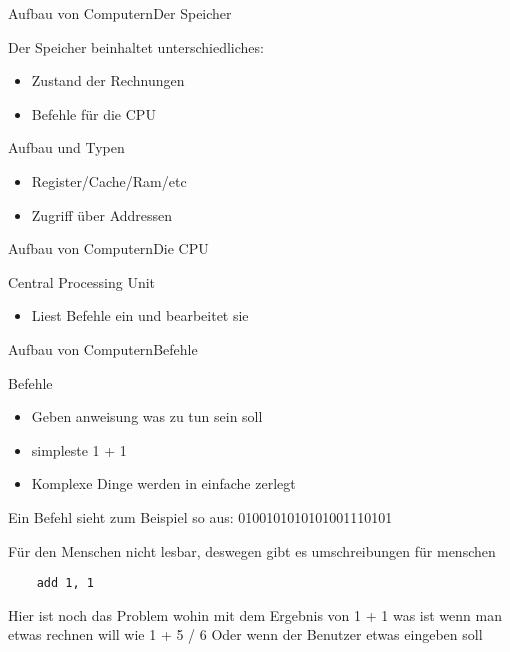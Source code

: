\begin{frame}{Aufbau von Computern}{Der Speicher}
		
	Der Speicher beinhaltet unterschiedliches:
	\begin{itemize}
	\item Zustand der Rechnungen
	\item Befehle für die CPU
	\end{itemize}
	
	Aufbau und Typen
	\begin{itemize}
	\item Register/Cache/Ram/etc
	\item Zugriff über Addressen
	\end{itemize}
	

\end{frame}




\begin{frame}{Aufbau von Computern}{Die CPU}
		
	Central Processing Unit
	\begin{itemize}
	\item Liest Befehle ein und bearbeitet sie
	\end{itemize}

\end{frame}


\begin{frame}[fragile]{Aufbau von Computern}{Befehle}
		
	Befehle
	\begin{itemize}
	\item Geben anweisung was zu tun sein soll
	\item simpleste 1 + 1 
	\item Komplexe Dinge werden in einfache zerlegt
	\end{itemize}
	
	Ein Befehl sieht zum Beispiel so aus:
	0100101010101001110101 
	
	Für den Menschen nicht lesbar, deswegen gibt es umschreibungen für menschen
	
	
	\begin{lstlisting}
	add 1, 1
	\end{lstlisting}
	
	Hier ist noch das Problem wohin mit dem Ergebnis von 1 + 1
	was ist wenn man etwas rechnen will wie 1 + 5 / 6 
	Oder wenn der Benutzer etwas eingeben soll 
	
\end{frame}


